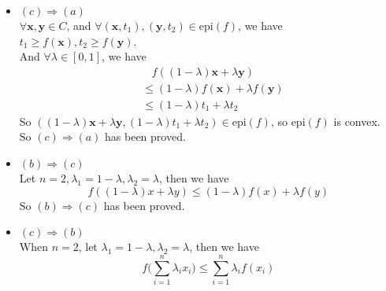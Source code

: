 \documentclass[10pt]{article}
\renewcommand{\mathbf}{\boldsymbol}
\begin{document}
\begin{enumerate}
\begin{itemize}
    \item $ (c) \Rightarrow (a)$\\
    $\forall\mathbf{x},\mathbf{y}\in C$, and $\forall(\mathbf{x},t_1),(\mathbf{y},t_2)\in\text{epi}(f)$, we have $t_1\geq f(\mathbf{x}),t_2\geq f(\mathbf{y})$.\\
    And $\forall\lambda\in[0,1]$, we have
    \begin{align*}
        &\ \ \ \ f((1-\lambda)\mathbf{x}+\lambda\mathbf{y})\\
        &\leq (1-\lambda)f(\mathbf{x})+\lambda f(\mathbf{y})\\
        &\leq (1-\lambda)t_1+\lambda t_2
    \end{align*}
    So $((1-\lambda)\mathbf{x}+\lambda \mathbf{y},(1-\lambda)t_1+\lambda t_2)\in\text{epi}(f)$, so $\text{epi}(f)$ is convex.\\
    So $ (c) \Rightarrow (a)$ has been proved.\\
    
    \item $ (b) \Rightarrow (c)$\\
    Let $n=2,\lambda_1=1-\lambda,\lambda_2=\lambda$, then we have
    $$f((1-\lambda)x+\lambda y)\leq (1-\lambda)f(x)+\lambda f(y)$$
    So $ (b) \Rightarrow (c)$ has been proved.\\
    
    \item $ (c) \Rightarrow (b)$\\
    When $n=2$, let $\lambda_1=1-\lambda,\lambda_2=\lambda$, then we have
    $$f\Big(\sum\limits_{i=1}^n \lambda_ix_i\Big)\leq \sum\limits_{i=1}^n \lambda_if(x_i)$$


\end{itemize}
\end{enumerate}
\end{document}
